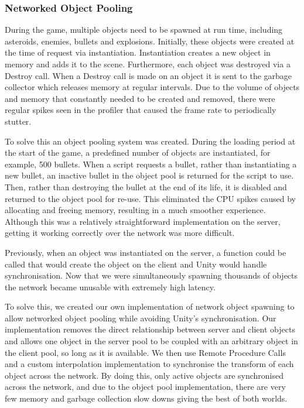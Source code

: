 \documentclass[a4paper,11pt]{article}
\begin{document}
\subsubsection{Networked Object Pooling}
During the game, multiple objects need to be spawned at run time, including asteroids, enemies, bullets and explosions. Initially, these objects were created at the time of request via instantiation. Instantiation creates a new object in memory and adds it to the scene. Furthermore, each object was destroyed via a Destroy call. When a Destroy call is made on an object it is sent to the garbage collector which releases memory at regular intervals. Due to the volume of objects and memory that constantly needed to be created and removed, there were regular spikes seen in the profiler that caused the frame rate to periodically stutter.

To solve this an object pooling system was created. During the loading period at the start of the game, a predefined number of objects are instantiated, for example, 500 bullets. When a script requests a bullet, rather than instantiating a new bullet, an inactive bullet in the object pool is returned for the script to use. Then, rather than destroying the bullet at the end of its life, it is disabled and returned to the object pool for re-use. This eliminated the CPU spikes caused by allocating and freeing memory, resulting in a much smoother experience. Although this was a relatively straightforward implementation on the server, getting it working correctly over the network was more difficult. 

Previously, when an object was instantiated on the server, a function could be called that would create the object on the client and Unity would handle synchronisation. Now that we were simultaneously spawning thousands of objects the network became unusable with extremely high latency. 

To solve this, we created our own implementation of network object spawning to allow networked object pooling while avoiding Unity’s synchronisation. Our implementation removes the direct relationship between server and client objects and allows one object in the server pool to be coupled with an arbitrary object in the client pool, so long as it is available. We then use Remote Procedure Calls and a custom interpolation implementation to synchronise the transform of each object across the network. By doing this, only active objects are synchronised across the network, and due to the object pool implementation, there are very few memory and garbage collection slow downs giving the best of both worlds.
\end{document}
